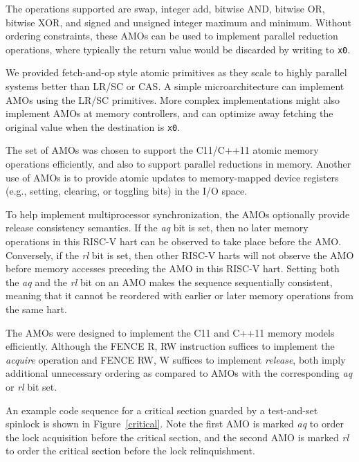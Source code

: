 The operations supported are swap, integer add, bitwise AND, bitwise
OR, bitwise XOR, and signed and unsigned integer maximum and minimum.
Without ordering constraints, these AMOs can be used to implement
parallel reduction operations, where typically the return value would
be discarded by writing to {\tt x0}.

\begin{commentary}
We provided fetch-and-op style atomic primitives as they scale to
highly parallel systems better than LR/SC or CAS.  A simple
microarchitecture can implement AMOs using the LR/SC primitives.  More
complex implementations might also implement AMOs at memory
controllers, and can optimize away fetching the original value when
the destination is {\tt x0}.

The set of AMOs was chosen to support the C11/C++11 atomic memory
operations efficiently, and also to support parallel reductions in
memory.  Another use of AMOs is to provide atomic updates to
memory-mapped device registers (e.g., setting, clearing, or toggling
bits) in the I/O space.
\end{commentary}

To help implement multiprocessor synchronization, the AMOs optionally
provide release consistency semantics.  If the {\em aq} bit is set,
then no later memory operations in this RISC-V hart can be observed
to take place before the AMO.
Conversely, if the {\em rl} bit is set, then other
RISC-V harts will not observe the AMO before memory accesses
preceding the AMO in this RISC-V hart.  Setting both the {\em aq} and the {\em
rl} bit on an AMO makes the sequence sequentially consistent, meaning that
it cannot be reordered with earlier or later memory operations from the same
hart.

\begin{commentary}
The AMOs were designed to implement the C11 and C++11 memory models
efficiently.  Although the FENCE R, RW instruction suffices to
implement the {\em acquire} operation and FENCE RW, W suffices to
implement {\em release}, both imply additional unnecessary ordering as
compared to AMOs with the corresponding {\em aq} or {\em rl} bit set.
\end{commentary}

An example code sequence for a critical section guarded by a
test-and-set spinlock is shown in Figure~\ref{critical}.  Note the
first AMO is marked {\em aq} to order the lock acquisition before the
critical section, and the second AMO is marked {\em rl} to order
the critical section before the lock relinquishment.

